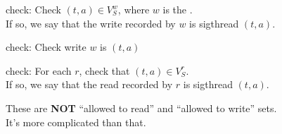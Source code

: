
 check: Check $(t,a) \in V_S^w$, where $w$ is the .\\
If so, we say that the write recorded by $w$ is  sigthread $(t,a)$.


 check: Check write $w$ is  $(t,a)$

 check: For each  $r$, check that $(t,a) \in V_S^r$.\\
If so, we say that the read recorded by $r$ is  sigthread $(t,a)$.

 These are \textbf{NOT} ``allowed to read'' and ``allowed to write'' sets.\\
It's more complicated than that.

